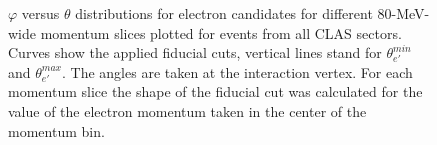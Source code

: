 \begin{figure}[htp]
\begin{center}
\caption{\small $\varphi$ versus $\theta$ distributions for electron candidates for different 80-MeV-wide momentum slices plotted for events from all CLAS sectors. Curves show the applied fiducial cuts, vertical lines stand for $\theta_{e'}^{min}$ and $\theta_{e'}^{max}$. The angles are taken at the interaction vertex. For each momentum slice the shape of the fiducial cut was calculated for the value of the electron momentum taken in the center of the momentum bin.  \label{fig:fiduch_el_2d}}
\end{center}
\end{figure}

\clearpage

